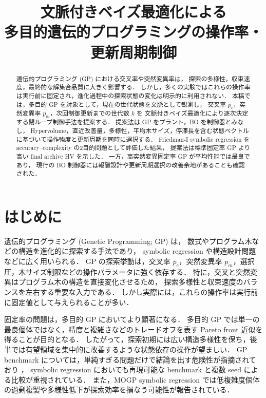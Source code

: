\documentclass[a4paper,10pt,twocolumn]{ltjsarticle}
\title{文脈付きベイズ最適化による\\多目的遺伝的プログラミングの操作率・更新周期制御}
\author{}
\date{}
\begin{document}
\maketitle

\begin{abstract}
遺伝的プログラミング (GP) における交叉率や突然変異率は，
探索の多様性，収束速度，最終的な解集合品質に大きく影響する．
しかし，多くの実験ではこれらの操作率は実行前に固定され，進化過程中の探索状態の変化は明示的に利用されない．
本稿では，多目的 GP を対象として，現在の世代状態を文脈として観測し，
交叉率 \(p_c\)，突然変異率 \(p_m\)，次回制御更新までの世代数 \(k\) を
文脈付きベイズ最適化により逐次決定する閉ループ制御手法を提案する．
提案法は GP をプラント，BO を制御器とみなし，
Hypervolume，直近改善量，多様性，平均木サイズ，停滞長を含む状態ベクトルに基づいて操作強度と更新周期を同時に選択する．
Friedman-I symbolic regression を accuracy--complexity の2目的問題として評価した結果，
提案法は標準固定率 GP より高い final archive HV を示した．
一方，高突然変異固定率 GP が平均性能では最良であり，
現行の BO 制御器には報酬設計や更新周期選択の改善余地があることも確認された．
\end{abstract}

\section{はじめに}

遺伝的プログラミング (Genetic Programming; GP) は，
数式やプログラム木などの構造を進化的に探索する手法であり，
symbolic regression や構造設計問題などに広く用いられる．
GP の探索挙動は，交叉率 \(p_c\)，突然変異率 \(p_m\)，選択圧，木サイズ制限などの操作パラメータに強く依存する．
特に，交叉と突然変異はプログラム木の構造を直接変化させるため，
探索多様性と収束速度のバランスを左右する重要な入力である．
しかし実際には，これらの操作率は実行前に固定値として与えられることが多い．

固定率の問題は，多目的 GP においてより顕著になる．
多目的 GP では単一の最良個体ではなく，精度と複雑さなどのトレードオフを表す Pareto front 近似を得ることが目的となる．
したがって，探索初期には広い構造多様性を保ち，後半では有望領域を集中的に改善するような状態依存の操作が望ましい．
GP benchmark については，単純すぎる問題だけで結論を出す危険性が指摘されており
\cite{mcdermott2012,white2013}，
symbolic regression においても再現可能な benchmark と複数 seed による比較が重視されている\cite{lacava2021}．
また，MOGP symbolic regression では低複雑度個体の過剰複製や多様性低下が探索効率を損なう可能性が報告されている\cite{liu2022}．
\end{document}
